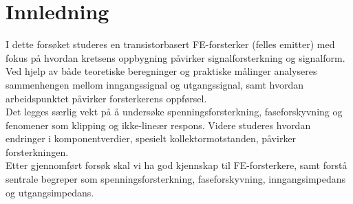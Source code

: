 \section{Innledning}
I dette forsøket studeres en transistorbasert FE-forsterker (felles emitter) med fokus på hvordan kretsens oppbygning påvirker signalforsterkning og signalform. Ved hjelp av både teoretiske beregninger og praktiske målinger analyseres sammenhengen mellom inngangssignal og utgangssignal, samt hvordan arbeidspunktet påvirker forsterkerens oppførsel.
\\[1em]
Det legges særlig vekt på å undersøke spenningsforsterkning, faseforskyvning og fenomener som klipping og ikke-lineær respons. Videre studeres hvordan endringer i komponentverdier, spesielt kollektormotstanden, påvirker forsterkningen.
\\[1em]
Etter gjennomført forsøk skal vi ha god kjennskap til FE-forsterkere, samt forstå sentrale begreper som spenningsforsterkning, faseforskyvning, inngangsimpedans og utgangsimpedans.